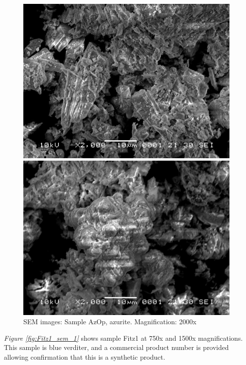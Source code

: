\begin{figure}[H]
\centering
\begin{minipage}{.45\textwidth}
  \centering
  \includegraphics[width=\linewidth]{AzOp_x2000_1_150321}
\end{minipage}
\begin{minipage}{.45\textwidth}
  \centering
  \includegraphics[width=\linewidth]{AzOp_x2000_4_150321}
\end{minipage}
\caption[SEM images: Sample AzOp, azurite]{SEM images: Sample AzOp, azurite. Magnification: 2000x}
\label{fig:azop_sem_2}
\end{figure}

\textit{Figure \ref{fig:Fitz1_sem_1}} shows sample Fitz1 at 750x and 1500x magnifications. This sample is blue verditer, and a commercial product number is provided allowing confirmation that this is a synthetic product.

